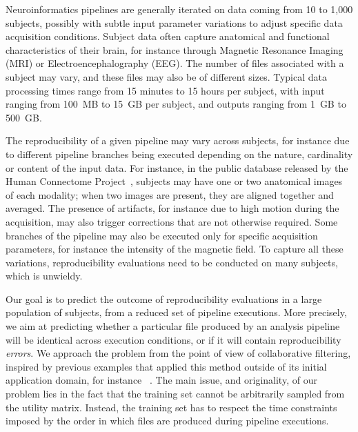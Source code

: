 \documentclass[10pt, conference, compsocconf]{IEEEtran}
\begin{document}
Neuroinformatics pipelines are generally iterated on data coming from 10 to 
1,000 subjects, possibly with subtle input parameter variations to 
adjust specific data acquisition conditions. Subject data often capture 
anatomical and functional characteristics of their brain, for instance through
Magnetic Resonance Imaging (MRI) or Electroencephalography (EEG). The number of files 
associated with a subject may vary, and these files may also be of 
different sizes. Typical data processing times range from 15 minutes to 
15 hours per subject, with input ranging from 100~MB to 15~GB per subject, and 
outputs ranging from 1~GB to 500~GB.

The reproducibility of a given pipeline may vary across subjects, for 
instance due to different pipeline branches being executed depending on 
the nature, cardinality or content of the input data. For instance, in 
the public database released by the Human Connectome 
Project~\cite{van2013wu}, subjects may have one or two anatomical images of 
each modality; when two images are 
present, they are aligned together and averaged. The presence of 
artifacts, for instance due to high motion during the acquisition, may 
also trigger corrections that are not otherwise required. Some branches 
of the pipeline may also be executed only for specific acquisition 
parameters, for instance the intensity of the magnetic field. To 
capture all these variations, reproducibility evaluations need to be 
conducted on many subjects, which is unwieldy. 

Our goal is to predict the outcome of reproducibility evaluations in a 
large population of subjects, from a reduced set of pipeline 
executions. More precisely, we aim at predicting whether a particular 
file produced by an analysis pipeline will be identical across 
execution conditions, or if it will contain reproducibility 
\emph{errors}. We approach the problem from the point of view of 
collaborative filtering, inspired by previous examples that applied 
this method outside of its initial application domain, for instance 
~\cite{feng2013efficient}. The main issue, and originality, of our 
problem lies in the fact that the training set cannot be arbitrarily 
sampled from the utility matrix. Instead, the training set has to 
respect the time constraints imposed by the order in which files 
are produced during pipeline executions.
\end{document}
